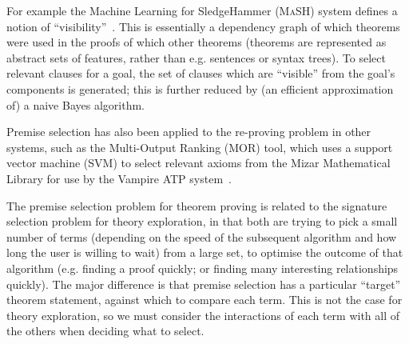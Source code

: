 For example the Machine Learning for SledgeHammer (\textsc{MaSH}) system
defines a notion of ``visibility''~\cite{kuhlwein2013mash}. This is essentially
a dependency graph of which theorems were used in the proofs of which other
theorems (theorems are represented as abstract sets of features, rather than
e.g. sentences or syntax trees). To select relevant clauses for a goal, the
set of clauses which are ``visible'' from the goal's components is generated;
this is further reduced by (an efficient approximation of) a naive Bayes
algorithm.

Premise selection has also been applied to the re-proving problem in other
systems, such as the Multi-Output Ranking (\textsc{MOR}) tool, which uses a
support vector machine (SVM) to select relevant axioms from the Mizar
Mathematical Library for use by the Vampire ATP system~\cite{alama2014premise}.

The premise selection problem for theorem proving is related to the signature
selection problem for theory exploration, in that both are trying to pick a
small number of terms (depending on the speed of the subsequent algorithm and
how long the user is willing to wait) from a large set, to optimise the outcome
of that algorithm (e.g. finding a proof quickly; or finding many interesting
relationships quickly). The major difference is that premise selection has a
particular ``target'' theorem statement, against which to compare each
term. This is not the case for theory exploration, so we must consider the
interactions of each term with all of the others when deciding what to select.
